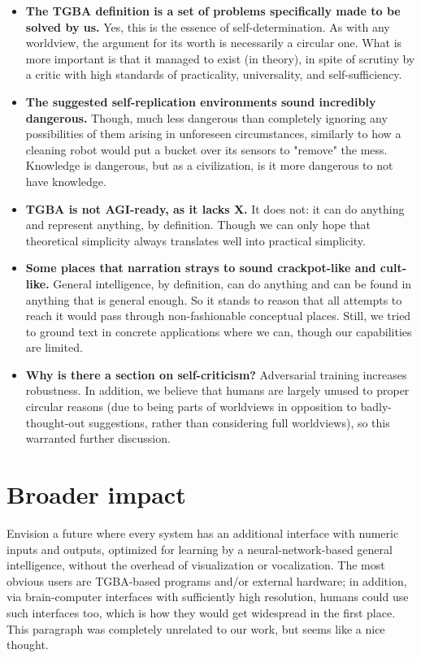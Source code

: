 \documentclass{article}
\begin{document}
\begin{itemize}
\item \textbf{The TGBA definition is a set of problems specifically made to be solved by us.} Yes, this is the essence of self-determination. As with any worldview, the argument for its worth is necessarily a circular one. What is more important is that it managed to exist (in theory), in spite of scrutiny by a critic with high standards of practicality, universality, and self-sufficiency.
\item \textbf{The suggested self-replication environments sound incredibly dangerous.} Though, much less dangerous than completely ignoring any possibilities of them arising in unforeseen circumstances, similarly to how a cleaning robot would put a bucket over its sensors to "remove" the mess. Knowledge is dangerous, but as a civilization, is it more dangerous to not have knowledge.
\item \textbf{TGBA is not AGI-ready, as it lacks X.} It does not: it can do anything and represent anything, by definition. Though we can only hope that theoretical simplicity always translates well into practical simplicity.
\item \textbf{Some places that narration strays to sound crackpot-like and cult-like.} General intelligence, by definition, can do anything and can be found in anything that is general enough. So it stands to reason that all attempts to reach it would pass through non-fashionable conceptual places. Still, we tried to ground text in concrete applications where we can, though our capabilities are limited.
\item \textbf{Why is there a section on self-criticism?} Adversarial training increases robustness. In addition, we believe that humans are largely unused to proper circular reasons (due to being parts of worldviews in opposition to badly-thought-out suggestions, rather than considering full worldviews), so this warranted further discussion.
\end{itemize}

\section{Broader impact}

Envision a future where every system has an additional interface with numeric inputs and outputs, optimized for learning by a neural-network-based general intelligence, without the overhead of visualization or vocalization. The most obvious users are TGBA-based programs and/or external hardware; in addition, via brain-computer interfaces with sufficiently high resolution, humans could use such interfaces too, which is how they would get widespread in the first place. This paragraph was completely unrelated to our work, but seems like a nice thought.
\end{document}
